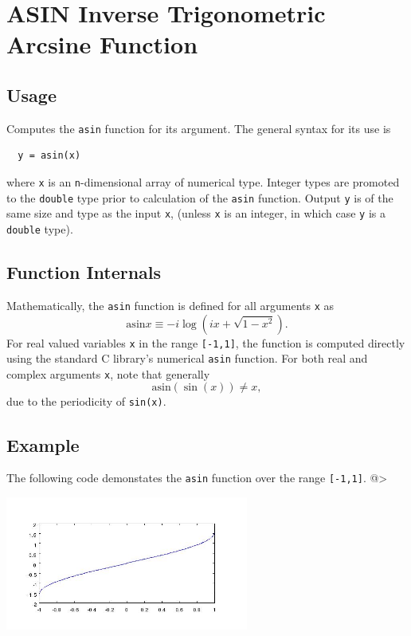 \section{ASIN Inverse Trigonometric Arcsine Function}

\subsection{Usage}

Computes the \verb|asin| function for its argument.  The general
syntax for its use is
\begin{verbatim}
  y = asin(x)
\end{verbatim}
where \verb|x| is an \verb|n|-dimensional array of numerical type.
Integer types are promoted to the \verb|double| type prior to
calculation of the \verb|asin| function.  Output \verb|y| is of the
same size and type as the input \verb|x|, (unless \verb|x| is an
integer, in which case \verb|y| is a \verb|double| type).  
\subsection{Function Internals}

Mathematically, the \verb|asin| function is defined for all 
arguments \verb|x| as
\[
   \mathrm{asin} x \equiv - i \log \left(i x + 
   \sqrt{1-x^2}\right).
\]
For real valued variables \verb|x| in the range \verb|[-1,1]|, the function is
computed directly using the standard C library's numerical \verb|asin|
function. For both real and complex arguments \verb|x|, note that generally
\[
   \mathrm{asin}(\sin(x)) \neq x,
\]
due to the periodicity of \verb|sin(x)|.
\subsection{Example}

The following code demonstates the \verb|asin| function over the range 
\verb|[-1,1]|.
@>


\centerline{\includegraphics[width=8cm]{asinplot}}

